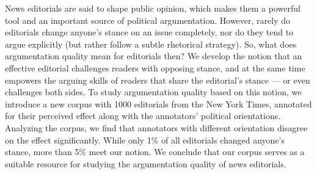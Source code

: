 News editorials are said to shape public opinion, which makes them a powerful tool and an important source of political argumentation. However, rarely do editorials change anyone's stance on an issue completely, nor do they tend to argue explicitly (but rather follow a subtle rhetorical strategy). So, what does argumentation quality mean for editorials then? We develop the notion that an effective editorial challenges readers with opposing stance, and at the same time empowers the arguing skills of readers that share the editorial's stance --- or even challenges both sides. To study argumentation quality based on this notion, we introduce a new corpus with 1000 editorials from the New York Times, annotated for their perceived effect along with the annotators' political orientations. Analyzing the corpus, we find that annotators with different orientation disagree on the effect significantly. While only 1\% of all editorials changed anyone's stance, more than 5\% meet our notion. We conclude that our corpus serves as a suitable resource for studying the argumentation quality of news editorials.
